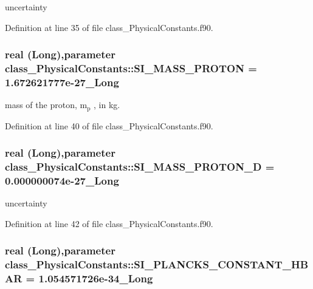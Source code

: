 uncertainty 



Definition at line 35 of file class\_\-PhysicalConstants.f90.

\hypertarget{namespaceclass__PhysicalConstants_a2449bd62711b0a1ee76be095516a13da}{
\subsubsection[{SI\_\-MASS\_\-PROTON}]{\setlength{\rightskip}{0pt plus 5cm}real (Long),parameter {\bf class\_\-PhysicalConstants::SI\_\-MASS\_\-PROTON} = 1.672621777e-\/27\_\-Long}}
\label{namespaceclass__PhysicalConstants_a2449bd62711b0a1ee76be095516a13da}


mass of the proton, m$_{\mbox{p}}$ , in kg. 



Definition at line 40 of file class\_\-PhysicalConstants.f90.

\hypertarget{namespaceclass__PhysicalConstants_a22a22c3caa590bb80989439fea138dca}{
\subsubsection[{SI\_\-MASS\_\-PROTON\_\-D}]{\setlength{\rightskip}{0pt plus 5cm}real (Long),parameter {\bf class\_\-PhysicalConstants::SI\_\-MASS\_\-PROTON\_\-D} = 0.000000074e-\/27\_\-Long}}
\label{namespaceclass__PhysicalConstants_a22a22c3caa590bb80989439fea138dca}


uncertainty 



Definition at line 42 of file class\_\-PhysicalConstants.f90.

\hypertarget{namespaceclass__PhysicalConstants_a600c7e7a8a69f32b4bcab8d52fc15073}{
\subsubsection[{SI\_\-PLANCKS\_\-CONSTANT\_\-HBAR}]{\setlength{\rightskip}{0pt plus 5cm}real (Long),parameter {\bf class\_\-PhysicalConstants::SI\_\-PLANCKS\_\-CONSTANT\_\-HBAR} = 1.054571726e-\/34\_\-Long}}
\label{namespaceclass__PhysicalConstants_a600c7e7a8a69f32b4bcab8d52fc15073}


